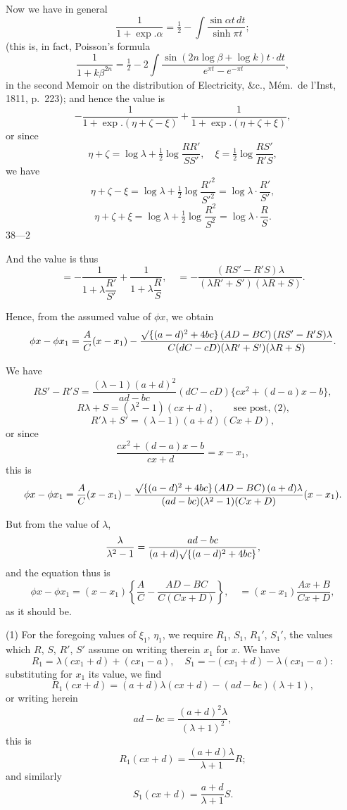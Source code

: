 \documentclass[12pt,a4paper]{article}
\theoremstyle{cayley}
\theoremstyle{definition}
\numberwithin{equation}{section}
\begin{document}
Now we have in general
\[
\frac{1}{1 + \exp. \alpha} = \tfrac{1}{2} - \int \frac{\sin \alpha t \, dt}{\sinh \pi t};
\]
(this is, in fact, Poisson's formula
\[
\frac{1}{1 + k\beta^{2n}} = \tfrac{1}{2} - 2\int \frac{\sin(2n \log \beta + \log k)t \cdot dt}{e^{\pi t} - e^{-\pi t}},
\]
in the second Memoir on the distribution of Electricity, \&c., M\'{e}m.\ de l'Inst, 1811, p.\ 223); and hence the value is
\[
-\frac{1}{1 + \exp. (\eta + \zeta - \xi)} + \frac{1}{1 + \exp. (\eta + \zeta + \xi)},
\]
or since
\[
\eta + \zeta = \log\lambda + \tfrac{1}{2}\log\frac{RR'}{SS'}, \quad \xi = \tfrac{1}{2}\log\frac{RS'}{R'S},
\]
we have
\[
\eta + \zeta - \xi = \log\lambda + \tfrac{1}{2}\log\frac{R'^2}{S'^2} = \log\lambda \cdot \frac{R'}{S'},
\]
\[
\eta + \zeta + \xi = \log\lambda + \tfrac{1}{2}\log\frac{R^2}{S^2} = \log\lambda \cdot \frac{R}{S}.
\]
\hfill $38\text{---}2$

And the value is thus
\[
= -\frac{1}{1 + \lambda \dfrac{R'}{S'}} + \frac{1}{1 + \lambda \dfrac{R}{S}}, \quad = -\frac{(RS' - R'S)\lambda}{(\lambda R' + S')(\lambda R + S)}.
\]

Hence, from the assumed value of $\phi x$, we obtain
\[
\phi x - \phi x_1 = \frac{A}{C}(x - x_1) - \frac{\surd\{(a - d)^2 + 4bc\}\,(AD - BC)\,(RS' - R'S)\lambda}{C(dC - cD)(\lambda R' + S')(\lambda R + S)}.
\]

We have
\[
RS' - R'S = \frac{(\lambda - 1)(a + d)^2}{ad - bc} (dC - cD) \{cx^2 + (d - a)x - b\},
\]
\[
R\lambda + S = (\lambda^2 - 1)(cx + d), \qquad \text{see post, (2),}
\]
\[
R'\lambda + S' = (\lambda - 1)(a + d)(Cx + D),
\]
or since
\[
\frac{cx^2 + (d - a)x - b}{cx + d} = x - x_1,
\]
this is
\[
\phi x - \phi x_1 = \frac{A}{C}(x - x_1) - \frac{\surd\{(a - d)^2 + 4bc\}\,(AD - BC)\,(a + d)\lambda}{(ad - bc)(\lambda^2 - 1)(Cx + D)}(x - x_1).
\]

But from the value of $\lambda$,
\[
\frac{\lambda}{\lambda^2 - 1} = \frac{ad - bc}{(a + d)\surd\{(a - d)^2 + 4bc\}},
\]
and the equation thus is
\[
\phi x - \phi x_1 = (x - x_1)\left\{\frac{A}{C} - \frac{AD - BC}{C(Cx + D)}\right\}, \quad = (x - x_1)\frac{Ax + B}{Cx + D},
\]
as it should be.

(1) For the foregoing values of $\xi_1$, $\eta_1$, we require $R_1$, $S_1$, $R_1'$, $S_1'$, the values which $R$, $S$, $R'$, $S'$ assume on writing therein $x_1$ for $x$. We have
\[
R_1 = \lambda(cx_1 + d) + (cx_1 - a), \quad S_1 = -(cx_1 + d) - \lambda(cx_1 - a):
\]
substituting for $x_1$ its value, we find
\[
R_1(cx + d) = (a + d)\lambda(cx + d) - (ad - bc)(\lambda + 1),
\]
or writing herein
\[
ad - bc = \frac{(a + d)^2\lambda}{(\lambda + 1)^2},
\]
this is
\[
R_1(cx + d) = \frac{(a + d)\lambda}{\lambda + 1} R;
\]
and similarly
\[
S_1(cx + d) = \frac{a + d}{\lambda + 1} S.
\]

\newpage
\end{document}
